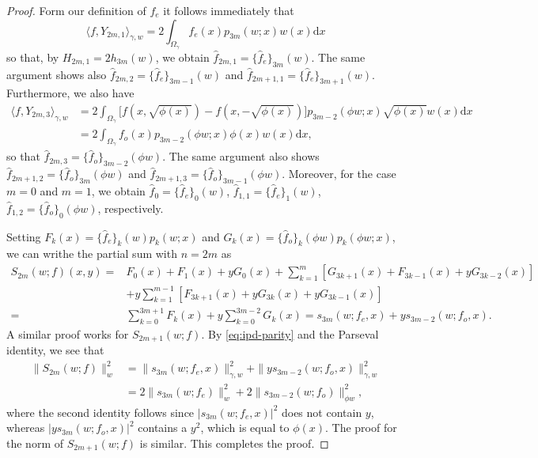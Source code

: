 \documentclass{amsart}
\theoremstyle{remark}
\def\la{{\langle}}
\def\ra{{\rangle}}
\def\d{\mathrm{d}}
\def\g{{\gamma}}
\def\la{{\langle}}
\def\ra{{\rangle}}
\newcommand{\wh}{\widehat}
\begin{document}
\begin{proof}
Form our definition of $f_e$ it follows immediately that 
$$
 \la f, Y_{2m,1} \ra_{\g,w} = 2 \int_{\Omega_\g}  f_e(x) p_{3m}(w;x) w(x) \d x
$$
so that, by $H_{2m,1} = 2 h_{3m}(w)$, we obtain $\wh f_{2m,1} = \{\wh f_e\}_{3m}(w)$. The same argument
shows also $\wh f_{2m,2} = \{\wh f_e\}_{3m-1}(w)$ and $\wh f_{2m+1,1} = \{\wh f_e\}_{3m+1}(w)$. Furthermore,
we also have 
\begin{align*}
 \la f, Y_{2m,3} \ra_{\g,w} & = 2 \int_{\Omega_\g}  \Big[ f\left(x,\sqrt{\phi(x)}\right) - f\left(x,- \sqrt{\phi(x)}\right) \Big]
     p_{3m-2}(\phi w;x) \sqrt{\phi(x)} w(x) \d x \\
     &  = 2 \int_{\Omega_\g}   f_o(x)  p_{3m-2}(\phi w;x) \phi(x) w(x) \d x, 
\end{align*}
so that $\wh f_{2m,3} = \{\wh f_o\}_{3m-2}(\phi w)$. The same argument also shows $\wh f_{2m+1,2} =
 \{\wh f_o\}_{3m}(\phi w)$ and $\wh f_{2m+1,3} = \{\wh f_o\}_{3m-1}(\phi w)$. Moreover, for the case 
 $m=0$ and $m=1$, we obtain $\wh f_0 = \{\wh f_e\}_0(w)$, $\wh f_{1,1} = \{\wh f_e\}_1(w)$, 
$\wh f_{1,2} = \{\wh f_o\}_0(\phi w)$, respectively. 

Setting $F_k(x) =  \{\wh f_e\}_k(w) p_k(w;x)$ and $G_k(x) =  \{\wh f_o\}_k(\phi w) p_k(\phi w;x)$, we can 
writhe the partial sum with $n = 2m$ as 
\begin{align*}
 S_{2m}(w; f)(x,y)  = & F_0(x) + F_1(x) + y G_0(x)  + \sum_{k=1}^{m} \left[G_{3k+1}(x) +F_{3k-1}(x) + y G_{3k-2} (x) \right]\\
    & + y \sum_{k=1}^{m-1} \left[F_{3k+1}(x) + y G_{3k}(x) + y G_{3k-1} (x) \right]\\
   = & \sum_{k=0}^{3m+1} F_k (x) + y \sum_{k=0}^{3m-2} G_k(x) =
   s_{3m} (w; f_e, x) + y s_{3m-2} (w; f_o, x).
\end{align*}
A similar proof works for $S_{2m+1}(w;f)$. By \eqref{eq:ipd-parity} and the Parseval identity, we see that 
\begin{align*}
 \|S_{2m}(w;f)\|_w^2 & = \|s_{3m} (w; f_e, x) \|_{\g,w}^2 + \| y s_{3m-2} (w; f_o, x)\|_{\g,w}^2 \\
      & = 2 \|s_{3m} (w; f_e) \|_{w}^2 +2 \| s_{3m-2} (w; f_o)\|_{\phi w}^2,
\end{align*}
where the second identity follows since $|s_{3m} (w; f_e, x)|^2$ does not contain $y$, whereas
$|y s_{3m} (w; f_o, x)|^2$ contains a $y^2$, which is equal to $\phi(x)$. The proof for the norm of 
$S_{2m+1}(w;f)$ is similar. This completes the proof. 
\end{proof}
\end{document}
